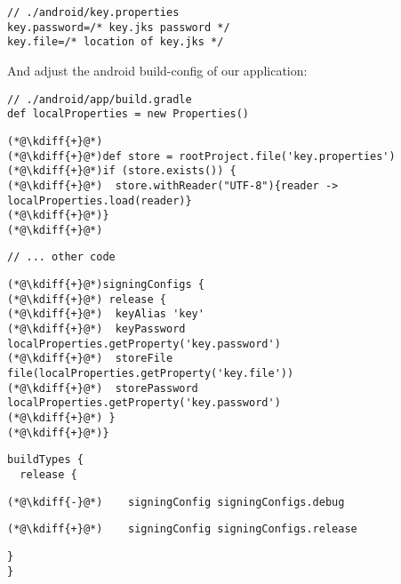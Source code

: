 \begin{lstlisting}
// ./android/key.properties
key.password=/* key.jks password */
key.file=/* location of key.jks */
\end{lstlisting}

\noindent And adjust the android build-config of our application:\\

{
\xpretocmd{\lstlisting}{\vspace{-12pt}}{}{}
\begin{lstlisting}
// ./android/app/build.gradle
def localProperties = new Properties()
\end{lstlisting}
\begin{lstlisting}[firstnumber=3, backgroundcolor=\color{backgreen}]
(*@\kdiff{+}@*)
(*@\kdiff{+}@*)def store = rootProject.file('key.properties')
(*@\kdiff{+}@*)if (store.exists()) {
(*@\kdiff{+}@*)  store.withReader("UTF-8"){reader -> localProperties.load(reader)}
(*@\kdiff{+}@*)}
(*@\kdiff{+}@*)
\end{lstlisting}
\begin{lstlisting}[firstnumber=9]
// ... other code
\end{lstlisting}
\begin{lstlisting}[firstnumber=63, backgroundcolor=\color{backgreen}]
(*@\kdiff{+}@*)signingConfigs {
(*@\kdiff{+}@*) release {
(*@\kdiff{+}@*)  keyAlias 'key'
(*@\kdiff{+}@*)  keyPassword localProperties.getProperty('key.password')
(*@\kdiff{+}@*)  storeFile file(localProperties.getProperty('key.file'))
(*@\kdiff{+}@*)  storePassword localProperties.getProperty('key.password')
(*@\kdiff{+}@*) }
(*@\kdiff{+}@*)}
\end{lstlisting}
\begin{lstlisting}[firstnumber=71]
buildTypes {
  release {
\end{lstlisting}
\begin{lstlisting}[firstnumber=73, backgroundcolor=\color{backred}]
(*@\kdiff{-}@*)    signingConfig signingConfigs.debug
\end{lstlisting}
\begin{lstlisting}[firstnumber=73, backgroundcolor=\color{backgreen}]
(*@\kdiff{+}@*)    signingConfig signingConfigs.release
\end{lstlisting}
\begin{lstlisting}[firstnumber=74]
  }
}
\end{lstlisting}
}
